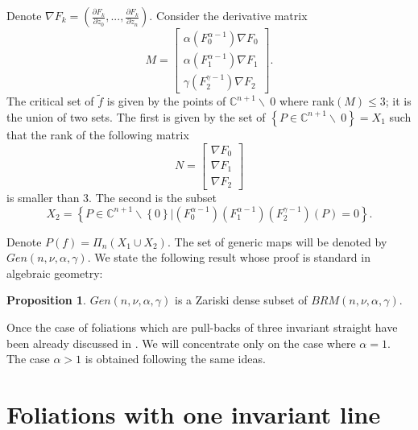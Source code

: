 \documentclass{amsart}
\theoremstyle{definition}
\theoremstyle{proposition}
\newtheorem{proposition}[theorem]{Proposition}
\numberwithin{equation}{section}
\theoremstyle{main}
\begin{document}
Denote $\nabla F_{k}= (\frac{\partial F_{k}}{\partial z_{0}},...,\frac{\partial F_{k}}{\partial z_{n}})$. Consider the derivative matrix 
{\tiny{ $$M=\begin{bmatrix}
 \alpha\left(F_{0}^{\alpha-1}\right)\nabla F_{0} \\ \alpha\left(F_{1}^{\alpha-1}\right)\nabla F_{1} \\  \gamma\left(F_{2}^{\gamma-1}\right)\nabla F_{2}  
 \end{bmatrix}.$$ }}
The critical set of $\tilde{f}$ is given by the points of $ \mathbb C^{n+1}\backslash \ {0}$ where rank$(M)\leq3$; it is the union of two sets. The first is given by   the set of $\left\{ P \in \mathbb C^{n+1}\backslash \ {0} \right\}=X_{1}$ such that the rank of the following matrix 
 {\tiny{$$N=\begin{bmatrix}
 \nabla F_{0} \\ \nabla F_{1} \\ \nabla F_{2}  
 \end{bmatrix}$$ }}is smaller than $3.$ The second is the subset
$$X_2=\left\{ P \in \mathbb C^{n+1}\backslash \left\{0\right\} |\left(F_{0}^{\alpha-1}\right)\left(F_{1}^{\alpha-1}\right)\left(F_{2}^{\gamma-1}\right)\left(P\right)=0 \right\}.$$

Denote $P\left(f\right)=\Pi_{n}\left(X_{1} \cup X_{2}\right)$. The set of generic maps will be denoted by $Gen\left(n,\nu,\alpha,\gamma\right)$. We state the following result whose proof is standard in algebraic geometry:
\begin{proposition} $Gen\left(n,\nu,\alpha,\gamma\right)$ is a Zariski dense subset of $BRM\left(n,\nu,\alpha,\gamma\right)$.
\end{proposition}

Once the case of foliations which are pull-backs of three invariant straight have been already discussed in \cite{cs}. We will concentrate only on the case where $\alpha=1$. The case $\alpha>1$ is obtained following the same ideas. 
\section{Foliations with one invariant line}
\end{document}
